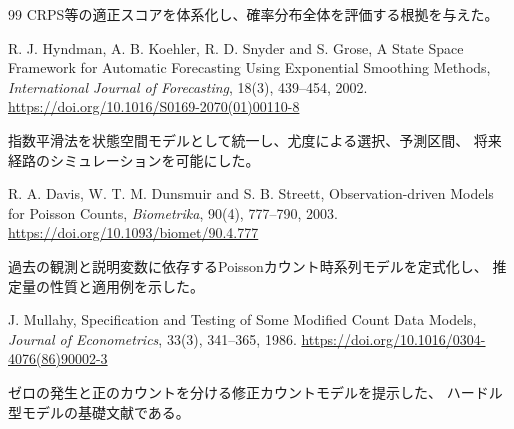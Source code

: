 \documentclass[a4paper,11pt]{jsarticle}
\begin{document}
\begin{thebibliography}{99}
CRPS等の適正スコアを体系化し、確率分布全体を評価する根拠を与えた。

R. J. Hyndman, A. B. Koehler, R. D. Snyder and S. Grose,
A State Space Framework for Automatic Forecasting Using Exponential Smoothing Methods,
\textit{International Journal of Forecasting}, 18(3), 439--454, 2002.
\url{https://doi.org/10.1016/S0169-2070(01)00110-8}

指数平滑法を状態空間モデルとして統一し、尤度による選択、予測区間、
将来経路のシミュレーションを可能にした。

R. A. Davis, W. T. M. Dunsmuir and S. B. Streett,
Observation-driven Models for Poisson Counts,
\textit{Biometrika}, 90(4), 777--790, 2003.
\url{https://doi.org/10.1093/biomet/90.4.777}

過去の観測と説明変数に依存するPoissonカウント時系列モデルを定式化し、
推定量の性質と適用例を示した。

J. Mullahy, Specification and Testing of Some Modified Count Data Models,
\textit{Journal of Econometrics}, 33(3), 341--365, 1986.
\url{https://doi.org/10.1016/0304-4076(86)90002-3}

ゼロの発生と正のカウントを分ける修正カウントモデルを提示した、
ハードル型モデルの基礎文献である。
\end{thebibliography}
\end{document}
